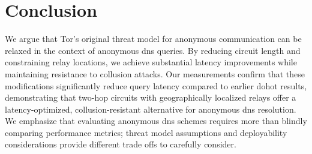 \section{Conclusion} \label{sec:conclusion} We argue that Tor's original threat
model for anonymous communication can be relaxed in the context of anonymous
\ac{dns} queries. By reducing circuit length and constraining relay locations,
we achieve substantial latency improvements while maintaining resistance to
collusion attacks. Our measurements confirm that these modifications
significantly reduce query latency compared to earlier \ac{dohot} results,
demonstrating that two-hop circuits with geographically localized relays offer a
latency-optimized, collusion-resistant alternative for anonymous \ac{dns} resolution.
We emphasize that evaluating anonymous \ac{dns} schemes requires more than
blindly comparing performance metrics; threat model assumptions and
deployability considerations provide different trade offs to carefully consider.

